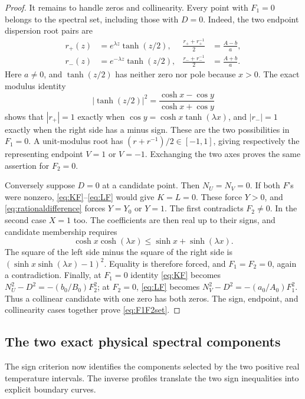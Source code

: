 \documentclass[11pt]{article}
\numberwithin{equation}{section}
\theoremstyle{definition}
\begin{document}
\begin{proof}
It remains to handle zeros and collinearity. Every point with \(F_1=0\)
belongs to the spectral set, including those with \(D=0\). Indeed, the
two endpoint dispersion root pairs are
\begin{align}
 r_+(z)&=e^{\lambda z}\tanh(z/2),&
 \frac{r_++r_+^{-1}}2&=\frac{A-b}{a},\label{eq:endpointplus}\\
 r_-(z)&=e^{-\lambda z}\tanh(z/2),&
 \frac{r_-+r_-^{-1}}2&=\frac{A+b}{a}.\label{eq:endpointminus}
\end{align}
Here \(a\ne0\), and \(\tanh(z/2)\) has neither zero nor pole because
\(x>0\). The exact modulus identity
\[
 |\tanh(z/2)|^2=\frac{\cosh x-\cos y}{\cosh x+\cos y}
\]
shows that \(|r_+|=1\) exactly when
\(\cos y=\cosh x\tanh(\lambda x)\), and \(|r_-|=1\) exactly when
the right side has a minus sign. These are the two possibilities in
\(F_1=0\). A unit-modulus root has \((r+r^{-1})/2\in[-1,1]\),
giving respectively the representing endpoint \(V=1\) or \(V=-1\).
Exchanging the two axes proves the same assertion for \(F_2=0\).

Conversely suppose \(D=0\) at a candidate point. Then \(N_U=N_V=0\).
If both \(F\)'s were nonzero, \eqref{eq:KF}--\eqref{eq:LF} would give
\(K=L=0\). These force \(Y>0\), and
\eqref{eq:rationaldifference} forces \(Y=Y_0\) or \(Y=1\).
The first contradicts \(F_2\ne0\). In the second case \(X=1\) too.
The coefficients are then real up to their signs, and candidate
membership requires
\[
 \cosh x\cosh(\lambda x)\le\sinh x+\sinh(\lambda x).
\]
The square of the left side minus the square of the right side is
\((\sinh x\sinh(\lambda x)-1)^2\). Equality is therefore forced,
and \(F_1=F_2=0\), again a contradiction. Finally, at \(F_1=0\)
identity \eqref{eq:KF} becomes
\(N_U^2-D^2=-(b_0/B_0)F_2^2\); at \(F_2=0\),
\eqref{eq:LF} becomes \(N_V^2-D^2=-(a_0/A_0)F_1^2\).
Thus a collinear candidate with one zero has both zeros. The sign, endpoint, and collinearity cases together prove
\eqref{eq:F1F2set}.
\end{proof}

\subsection{The two exact physical spectral components}

The sign criterion now identifies the components selected by the two
positive real temperature intervals. The inverse profiles translate
the two sign inequalities into explicit boundary curves.
\end{document}
